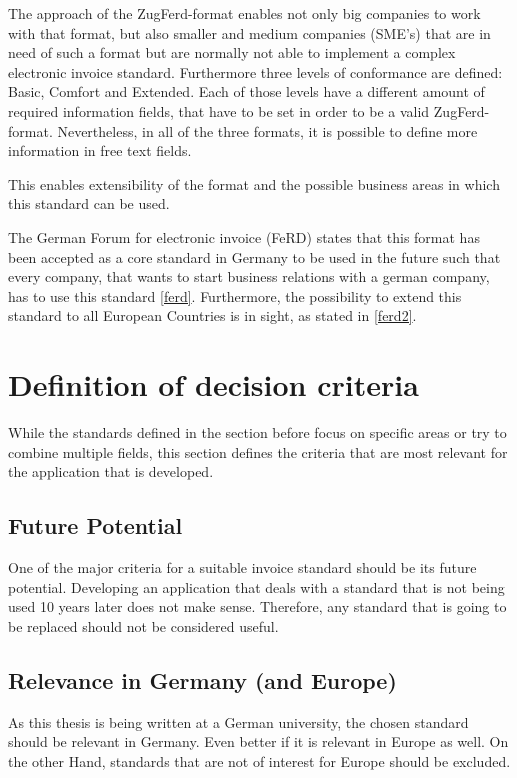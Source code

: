 \documentclass[english,mt]{lmedoc}
\begin{document}
The approach of the ZugFerd-format enables not only big companies to work with that format, but also smaller and medium companies (SME's) that are in need of such a format but are normally not able to implement a complex electronic invoice standard. 
Furthermore three levels of conformance are defined: Basic, Comfort and Extended. Each of those levels have a different amount of required information fields, that have to be set in order to be a valid ZugFerd-format. Nevertheless, in all of the three formats, it is possible to define more information in free text fields. 

This enables extensibility of the format and the possible business areas in which this standard can be used.

The German Forum for electronic invoice (FeRD) states that this format has been accepted as a core standard in Germany to be used in the future such that every company, that wants to start business relations with a german company, has to use this standard \ref{ferd}. Furthermore, the possibility to extend this standard to all European Countries is in sight, as stated in \ref{ferd2}.

\section{Definition of decision criteria}
\label{sec2.2}

While the standards defined in the section before focus on specific areas or try to combine multiple fields, this section defines the criteria that are most relevant for the application that is developed.

\subsection{Future Potential}
\label{sec2.2.1}
One of the major criteria for a suitable invoice standard should be its future potential. Developing an application that deals with a standard that is not being used 10 years later does not make sense. Therefore, any standard that is going to be replaced should not be considered useful.

\subsection{Relevance in Germany (and Europe)}
\label{sec2.2.2}
As this thesis is being written at a German university, the chosen standard should be relevant in Germany. Even better if it is relevant in Europe as well. On the other Hand, standards that are not of interest for Europe should be excluded.
\end{document}
